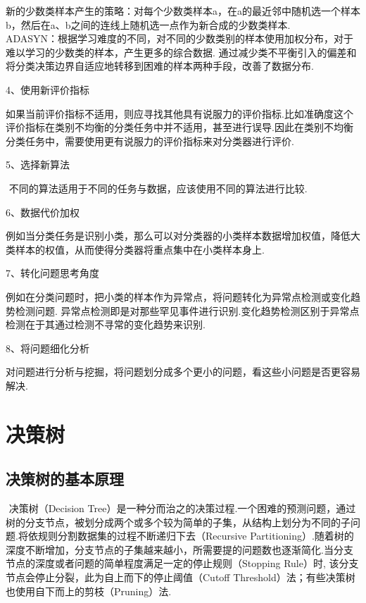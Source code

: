 ​
新的少数类样本产生的策略：对每个少数类样本a，在a的最近邻中随机选一个样本b，然后在a、b之间的连线上随机选一点作为新合成的少数类样本.\\
​
ADASYN：根据学习难度的不同，对不同的少数类别的样本使用加权分布，对于难以学习的少数类的样本，产生更多的综合数据.
通过减少类不平衡引入的偏差和将分类决策边界自适应地转移到困难的样本两种手段，改善了数据分布.

4、使用新评价指标

​
如果当前评价指标不适用，则应寻找其他具有说服力的评价指标.比如准确度这个评价指标在类别不均衡的分类任务中并不适用，甚至进行误导.因此在类别不均衡分类任务中，需要使用更有说服力的评价指标来对分类器进行评价.

5、选择新算法

​ 不同的算法适用于不同的任务与数据，应该使用不同的算法进行比较.

6、数据代价加权

​
例如当分类任务是识别小类，那么可以对分类器的小类样本数据增加权值，降低大类样本的权值，从而使得分类器将重点集中在小类样本身上.

7、转化问题思考角度

​
例如在分类问题时，把小类的样本作为异常点，将问题转化为异常点检测或变化趋势检测问题.
异常点检测即是对那些罕见事件进行识别.变化趋势检测区别于异常点检测在于其通过检测不寻常的变化趋势来识别.

8、将问题细化分析

​
对问题进行分析与挖掘，将问题划分成多个更小的问题，看这些小问题是否更容易解决.

\section{决策树}\label{ux51b3ux7b56ux6811}

\subsection{决策树的基本原理}\label{ux51b3ux7b56ux6811ux7684ux57faux672cux539fux7406}

​ 决策树（Decision
Tree）是一种分而治之的决策过程.一个困难的预测问题，通过树的分支节点，被划分成两个或多个较为简单的子集，从结构上划分为不同的子问题.将依规则分割数据集的过程不断递归下去（Recursive
Partitioning）.随着树的深度不断增加，分支节点的子集越来越小，所需要提的问题数也逐渐简化.当分支节点的深度或者问题的简单程度满足一定的停止规则（Stopping
Rule）时, 该分支节点会停止分裂，此为自上而下的停止阈值（Cutoff
Threshold）法；有些决策树也使用自下而上的剪枝（Pruning）法.

